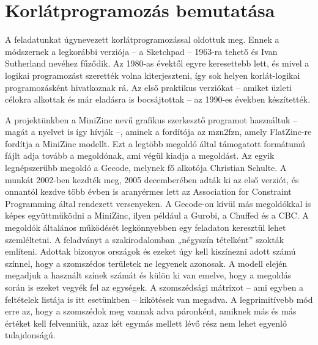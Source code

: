 \documentclass[12pt,a4paper,twoside, openright]{report}
\begin{document}
\section{Korlátprogramozás bemutatása} 

    A feladatunkat úgynevezett korlátprogramozással oldottuk meg.
    Ennek a módszernek a legkorábbi verziója – a Sketchpad – 1963-ra tehető és Ivan Sutherland nevéhez fűződik\cite{sketchpad}.
    Az 1980-as évektől egyre keresettebb lett, és mivel a logikai programozást szerették volna kiterjeszteni, így sok helyen korlát-logikai programozásként hivatkoznak rá.
    Az első praktikus verziókat – amiket üzleti célokra alkottak és már eladásra is bocsájtottak – az 1990-es években készítették.

    A projektünkben a MiniZinc nevű grafikus szerkesztő programot használtuk – magát a nyelvet is így hívják –, aminek a fordítója az mzn2fzn, amely FlatZinc-re fordítja a MiniZinc modellt.
    Ezt a legtöbb megoldó által támogatott formátumú fájlt adja tovább a megoldónak, ami végül kiadja a megoldást.
    Az egyik legnépszerűbb megoldó a Gecode, melynek fő alkotója Christian Schulte\cite{gecode}.
    A munkát 2002-ben kezdték meg, 2005 decemberében adták ki az első verziót, és onnantól kezdve több évben is aranyérmes lett az Association for Constraint Programming által rendezett versenyeken.
    A Gecode-on kívül más megoldókkal is képes együttműködni a MiniZinc, ilyen például a Gurobi, a Chuffed és a CBC.
    A megoldók általános működését legkönnyebben egy feladaton keresztül lehet szemléltetni.
    A feladványt a szakirodalomban „négyszín tételként” szokták említeni.
    Adottak bizonyos országok és ezeket úgy kell kiszínezni adott számú színnel, hogy a szomszédos területek ne legyenek azonosak.
    A modell elején megadjuk a használt színek számát és külön ki van emelve, hogy a megoldás során is ezeket vegyék fel az egységek.
    A szomszédsági mátrixot – ami egyben a feltételek listája is itt esetünkben – kikötések van megadva.
    A legprimitívebb mód erre az, hogy a szomszédok meg vannak adva páronként, amiknek más és más értéket kell felvenniük, azaz két egymás mellett lévő rész nem lehet egyenlő tulajdonságú.

\end{document}
